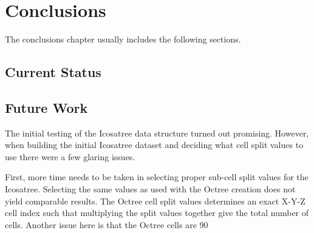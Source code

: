 \chapter{Conclusions}


The conclusions chapter usually includes the following sections.



\section{Current Status}

\section{Future Work}

The initial testing of the Icosatree data structure turned out promising. However, when building the initial Icosatree dataset and deciding what cell split values to use there were a few glaring issues. 

First, more time needs to be taken in selecting proper sub-cell split values for the Icosatree. Selecting the same values as used with the Octree creation does not yield comparable results. The Octree cell split values determines an exact X-Y-Z cell index such that multiplying the split values together give the total number of cells. Another issue here is that the Octree cells are 90%

